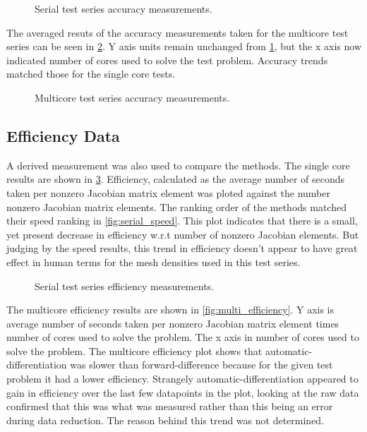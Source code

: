 \documentclass[preprint,12pt]{elsarticle}
\begin{document}
\begin{figure}[h]
  \centering
  \scalebox{1.0}{}
  \caption{Serial test series accuracy measurements.}
  \label{fig:serial_accuracy}
\end{figure}

The averaged resuts of the accuracy measurements taken for the multicore test series can be seen in
\ref{fig:multi_accuracy}. Y axis units remain unchanged from \ref{fig:serial_accuracy}, but the x
axis now indicated number of cores used to solve the test problem. Accuracy trends matched those for
the single core tests. 

\begin{figure}[h]
  \centering
  \scalebox{1.0}{}
  \caption{Multicore test series accuracy measurements.}
  \label{fig:multi_accuracy}
\end{figure}

\subsection{Efficiency Data}
A derived measurement was also used to compare the methods. The single core results are shown in
\ref{fig:serial_efficiency}. Efficiency, calculated as the average number of seconds taken per nonzero Jacobian matrix element 
was ploted against the number nonzero Jacobian matrix elements. The ranking order of the methods
matched their speed ranking in \ref{fig:serial_speed}. This plot indicates that there is a small,
yet present decrease in efficiency w.r.t number of nonzero Jacobian elements. But judging by the
speed results, this trend in efficiency doesn't appear to have great effect in human terms for the
mesh densities used in this test series.  

\begin{figure}[h]
  \centering
  \scalebox{1.0}{}
  \caption{Serial test series efficiency measurements.}
  \label{fig:serial_efficiency}
\end{figure}

The multicore efficiency results are shown in \ref{fig:multi_efficiency}. Y axis is average number
of seconds taken per nonzero Jacobian matrix element times number of cores used to solve the
problem. The x axis in number of cores used to solve the problem. The multicore efficiency plot
shows that automatic-differentiation was slower than forward-difference because for the given test
problem it had a lower efficiency. Strangely automatic-differentiation appeared to gain in
efficiency over the last few datapoints in the plot, looking at the raw data confirmed that this was
what was measured rather than this being an error during data reduction. The reason behind this
trend was not determined.
\end{document}
